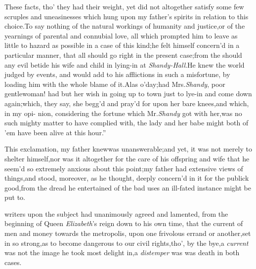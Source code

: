 \documentclass{article}
\begin{document}
These facts, tho’ they had their weight, yet did not
altogether satisfy some few scruples and uneasinesses which hung
upon my father’s spirits in relation to this choice.\tsk  To
say nothing of the natural workings of humanity and
justice,\tsk  or of the yearnings of parental and connubial love,
all which prompted him to leave as little to hazard as possible in a case of this
kind;\tsh  he felt himself concern’d in a particular
manner, that all should go right in the present case;\tsk  from
the
should any evil betide his
wife and child in lying-in at \textit{Shandy-Hall}.\tsh  He
knew the world judged by events, and would add to his afflictions
in such a misfortune, by loading him with the whole blame of
it.\tsh  \lqq Alas o’day;\tsk had Mrs.\@ \textit{Shandy},\break
\lqq poor gentlewoman! had but her wish\break
\lqq in going up to town just to lye-in and\break
\lqq come down again;\tsk  which, they say,\break
\lqq she begg’d and pray’d for upon her\break
\lqq bare knees,\tsh  and which, in my opi-\break
\lqq nion, considering the fortune which\break
\lqq Mr.\@ \textit{Shandy} got with her,\tsk  was no such\break
\lqq mighty matter to have complied with,\break
\lqq the lady and her babe might both of\break
\lqq ’em have been alive at this hour.”

This exclamation, my father knew\break was unanswerable;\tsk  and
yet, it was not merely to shelter himself,\tsk  nor was it
altogether for the care of his offspring and wife that he seem’d so
extremely anxious about this point;\tsk  my father had extensive
views of things,\tsh  and stood, moreover, as he thought,
deeply concern’d in it for the publick good,\break from the dread he
entertained of the bad uses an ill-fated instance might be put
to.

\noindent
{}
writers upon the subject
had unanimous\-ly agreed and lamented, from the beginning of Queen
\textit{Elizabeth}’s reign down to his own time, that the
current of men and money towards the metropolis, upon one frivolous
errand or another,\tsh\break set in so strong,\tsk  as to become
dangerous to our civil rights,\tsk  tho’, by the
bye,\tsh  a \textit{current} was not the image he took most
delight in,\tsk  a \textit{distemper} was
was death in both cases.
\end{document}
